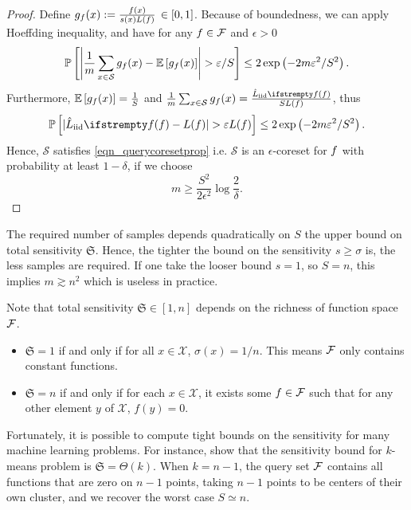 \begin{proof}
    Define $g_f(x) :=  \frac{f(x)}{s(x) L(f)}  \, \in[0,1]$.
    Because of boundedness, we can apply Hoeffding inequality, and have for any $f \in \mathcal{F}$ and $\epsilon>0$
    \begin{equation*}
        \mathbb{P}\left[\left|\frac{1}{m} \sum_{x \in \mathcal{S}} g_{\query}(x) - \mathbb{E}\left[g_{\query}(x)\right]\right|>\epsilon/S\right] \leq 2 \exp \left(-2 m \epsilon^2/S^2\right).
    \end{equation*}
    Furthermore, $\mathbb{E}\left[g_{f}(x)\right]=\frac{1}{S}$ and $\frac{1}{m} \sum_{x \in \mathcal{S}} g_{\query}(x)=\frac{\estloss{\textrm{iid}}{\query}}{S L(\query)}$, thus
    \begin{equation*}
        \mathbb{P}\left[|\estloss{\textrm{iid}}{\query} - L(\query)|>\epsilon L(\query)\right] \leq 2 \exp \left(-2 m \epsilon^2/S^2\right).
    \end{equation*}
    Hence, $\mathcal{S}$ satisfies \cref{eqn_querycoresetprop} i.e. $\mathcal{S}$ is an $\epsilon$-coreset for $f$  with probability at least $1-\delta$, if we choose
    \begin{equation*}
        m \geq \frac{S^{2}}{2 \epsilon^{2}} \log \frac{2}{\delta}.
    \end{equation*}
\end{proof}






The required number of samples depends quadratically on $S$ the upper bound on total sensitivity $\mathfrak{S}$. Hence, the tighter the bound on the sensitivity $s \geq \sigma$ is, the less samples are required. If one take the looser bound $s=1$, so $S=n$, this implies $m \gtrsim n^2$ which is useless in practice.

Note that total sensitivity $\mathfrak{S} \in [1,n]$ depends on the richness of function space $\mathcal{F}$. 
\begin{itemize}
    \item $\mathfrak{S}=1$ if and only if for all $x\in\mathcal{X}$, $\sigma(x)=1/n$. This means $\mathcal{F}$ only contains constant functions.
    \item $\mathfrak{S}=n$ if and only if for each $x\in \mathcal{X}$, it exists some $f \in \mathcal{F}$ such that for any other element $y$ of $\mathcal{X}$, $f(y)=0$.
\end{itemize}

Fortunately, it is possible to compute tight bounds on the sensitivity for many machine learning problems. For instance, \cite{lucic2016_lineartime_detection_via_sensitivity} show that the sensitivity bound for $k$-means problem is $\mathfrak{S} = \Theta(k)$. When $k = n-1$, the query set $\mathcal{F}$ contains all functions that are zero on $n-1$ points, taking $n-1$ points to be centers of their own cluster, and we recover the worst case $S\simeq n$.



